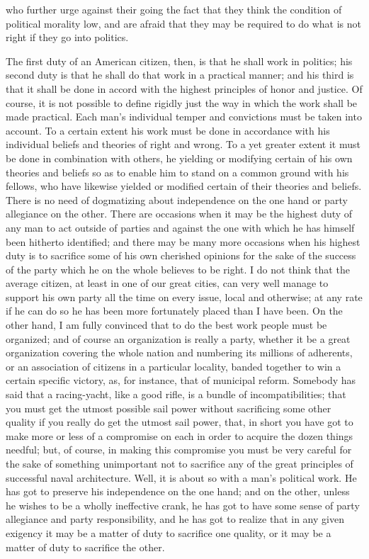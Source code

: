 \documentclass[a4paper]{amsbook}
\begin{document}
who further urge against their going the fact that they think the condition of political morality low, and are afraid that they may be required to do what is not right if they go into politics.

The first duty of an American citizen, then, is that he shall work in politics; his second duty is that he shall do that work in a practical manner; and his third is that it shall be done in accord with the highest principles of honor and justice. Of course, it is not possible to define rigidly just the way in which the work shall be made practical. Each man's individual temper and convictions must be taken into account. To a certain extent his work must be done in accordance with his individual beliefs and theories of right and wrong. To a yet greater extent it must be done in combination with others, he yielding or modifying certain of his own theories and beliefs so as to enable him to stand on a common ground with his fellows, who have likewise yielded or modified certain of their theories and beliefs. There is no need of dogmatizing about independence on the one hand or party allegiance on the other. There are occasions when it may be the highest duty of any man to act outside of parties and against the one with which he has himself been hitherto identified; and there may be many more occasions when his highest duty is to sacrifice some of his own cherished opinions for the sake of the success of the party which he on the whole believes to be right. I do not think that the average citizen, at least in one of our great cities, can very well manage to support his own party all the time on every issue, local and otherwise; at any rate if he can do so he has been more fortunately placed than I have been. On the other hand, I am fully convinced that to do the best work people must be organized; and of course an organization is really a party, whether it be a great organization covering the whole nation and numbering its millions of adherents, or an association of citizens in a particular locality, banded together to win a certain specific victory, as, for instance, that of municipal reform. Somebody has said that a racing-yacht, like a good rifle, is a bundle of incompatibilities; that you must get the utmost possible sail power without sacrificing some other quality if you really do get the utmost sail power, that, in short you have got to make more or less of a compromise on each in order to acquire the dozen things needful; but, of course, in making this compromise you must be very careful for the sake of something unimportant not to sacrifice any of the great principles of successful naval architecture. Well, it is about so with a man's political work. He has got to preserve his independence on the one hand; and on the other, unless he wishes to be a wholly ineffective crank, he has got to have some sense of party allegiance and party responsibility, and he has got to realize that in any given exigency it may be a matter of duty to sacrifice one quality, or it may be a matter of duty to sacrifice the other.
\end{document}

